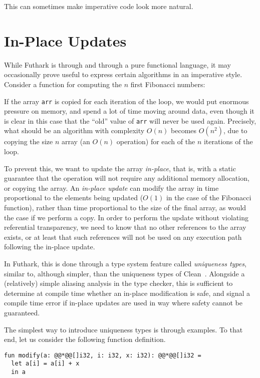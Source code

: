 \documentclass[11pt]{book}
\begin{document}
This can sometimes make imperative code look more natural.

\section{In-Place Updates}
\label{sec:in-place-updates}

While Futhark is through and through a pure functional language, it
may occasionally prove useful to express certain algorithms in an
imperative style.  Consider a function for computing the $n$ first
Fibonacci numbers:



If the array \texttt{arr} is copied for each iteration of the loop, we
would put enormous pressure on memory, and spend a lot of time moving
around data, even though it is clear in this case that the ``old''
value of \texttt{arr} will never be used again.  Precisely, what
should be an algorithm with complexity $O(n)$ becomes $O(n^2)$, due to
copying the size $n$ array (an $O(n)$ operation) for each of the $n$
iterations of the loop.

To prevent this, we want to update the array \textit{in-place}, that
is, with a static guarantee that the operation will not require any
additional memory allocation, or copying the array.  An
\textit{in-place update} can modify the array in time proportional to
the elements being updated ($O(1)$ in the case of the Fibonacci
function), rather than time proportional to the size of the final
array, as would the case if we perform a copy.  In order to perform
the update without violating referential transparency, we need to know
that no other references to the array exists, or at least that such
references will not be used on any execution path following the
in-place update.

In Futhark, this is done through a type system feature called
\textit{uniqueness types}, similar to, although simpler, than the
uniqueness types of
Clean~\cite{clean-uniqueness-types,barendsen1996uniqueness}.
Alongside a (relatively) simple aliasing analysis in the type checker,
this is sufficient to determine at compile time whether an in-place
modification is safe, and signal a compile time error if in-place
updates are used in way where safety cannot be guaranteed.

The simplest way to introduce uniqueness types is through examples.
To that end, let us consider the following function definition.

\begin{lstlisting}
fun modify(a: @@*@@[]i32, i: i32, x: i32): @@*@@[]i32 =
  let a[i] = a[i] + x
  in a
\end{lstlisting}
\end{document}
